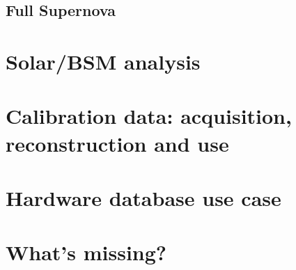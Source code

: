 \subsection{Full Supernova}

\section{Solar/BSM analysis}
\label{sec:use:BSManalysis}

\section{Calibration data: acquisition, reconstruction and use}
\label{sec:use:calib}  %

\section{Hardware database use case} 
\label{sec:use:hdb} 

\section{What's missing?}
\label{sec:use:todo}






